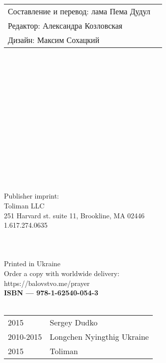 
\begin{tabular}{ll}
Составление и перевод: лама Пема Дудул\\
Редактор: Александра Козловская\\
Дизайн: Максим Сохацкий\\
\end{tabular}
\\
\\
\\
\\
\\
\\
\\
\\
\\
\\
\\
\\
\\
\\
Publisher imprint: \\
Toliman LLC \\
251 Harvard st. suite 11, Brookline, MA 02446 \\
1.617.274.0635 \\
\\
\\
\\
Printed in Ukraine \\

Order a copy with worldwide delivery: \\
https://balovstvo.me/prayer \\

{\bf  ISBN — 978-1-62540-054-3 \hspace{2em}} \\ \\

\begin{tabular}{ll}
\textcopyright{} 2015 & Sergey Dudko \\
\textcopyright{} 2010-2015 & Longchen Nyingthig Ukraine\\
\textcopyright{} 2015 & Toliman \\
\end{tabular}
